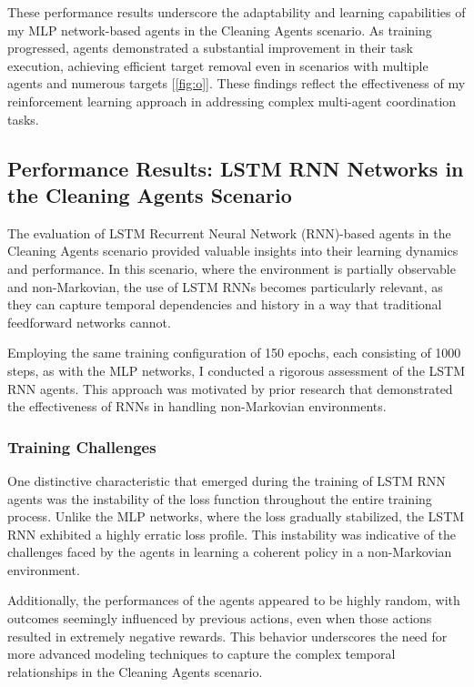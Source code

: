 \documentclass{scrartcl}
\begin{document}
These performance results underscore the adaptability and learning capabilities of my MLP network-based agents in the Cleaning Agents scenario. As training progressed, agents demonstrated a substantial improvement in their task execution, achieving efficient target removal even in scenarios with multiple agents and numerous targets [\ref{fig:o}].
These findings reflect the effectiveness of my reinforcement learning approach in addressing complex multi-agent coordination tasks.

\subsection{Performance Results: LSTM RNN Networks in the Cleaning Agents Scenario}

The evaluation of LSTM Recurrent Neural Network (RNN)-based agents in the Cleaning Agents scenario provided valuable insights into their learning dynamics and performance. In this scenario, where the environment is partially observable and non-Markovian, the use of LSTM RNNs becomes particularly relevant, as they can capture temporal dependencies and history in a way that traditional feedforward networks cannot.

Employing the same training configuration of 150 epochs, each consisting of 1000 steps, as with the MLP networks, I conducted a rigorous assessment of the LSTM RNN agents. This approach was motivated by prior research \cite{4421430}\cite{4655239}\cite{Banchi_2018} that demonstrated the effectiveness of RNNs in handling non-Markovian environments.

\subsubsection{Training Challenges}

One distinctive characteristic that emerged during the training of LSTM RNN agents was the instability of the loss function throughout the entire training process. Unlike the MLP networks, where the loss gradually stabilized, the LSTM RNN exhibited a highly erratic loss profile. This instability was indicative of the challenges faced by the agents in learning a coherent policy in a non-Markovian environment.

Additionally, the performances of the agents appeared to be highly random, with outcomes seemingly influenced by previous actions, even when those actions resulted in extremely negative rewards. This behavior underscores the need for more advanced modeling techniques to capture the complex temporal relationships in the Cleaning Agents scenario.
\end{document}
